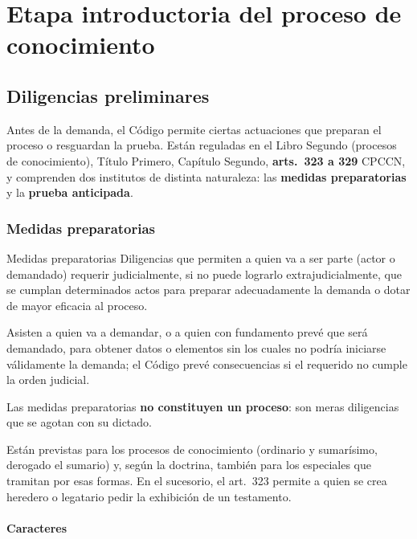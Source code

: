 \documentclass[12pt,oneside]{book}
\begin{document}
\part{Etapa introductoria del proceso de conocimiento}

\chapter{Diligencias preliminares}
\label{cap:diligencias}

Antes de la demanda, el Código permite ciertas actuaciones que preparan el proceso o resguardan la prueba. Están reguladas en el Libro Segundo (procesos de conocimiento), Título Primero, Capítulo Segundo, \textbf{arts.~323 a 329} CPCCN, y comprenden dos institutos de distinta naturaleza: las \textbf{medidas preparatorias} y la \textbf{prueba anticipada}.

\section{Medidas preparatorias}

\begin{definicion}{Medidas preparatorias}
Diligencias que permiten a quien va a ser parte (actor o demandado) requerir judicialmente, si no puede lograrlo extrajudicialmente, que se cumplan determinados actos para preparar adecuadamente la demanda o dotar de mayor eficacia al proceso.
\end{definicion}

Asisten a quien va a demandar, o a quien con fundamento prevé que será demandado, para obtener datos o elementos sin los cuales no podría iniciarse válidamente la demanda; el Código prevé consecuencias si el requerido no cumple la orden judicial.

\begin{importante}
Las medidas preparatorias \textbf{no constituyen un proceso}: son meras diligencias que se agotan con su dictado.
\end{importante}

Están previstas para los procesos de conocimiento (ordinario y sumarísimo, derogado el sumario) y, según la doctrina, también para los especiales que tramitan por esas formas. En el sucesorio, el art.~323 permite a quien se crea heredero o legatario pedir la exhibición de un testamento.

\subsection{Caracteres}
\end{document}

